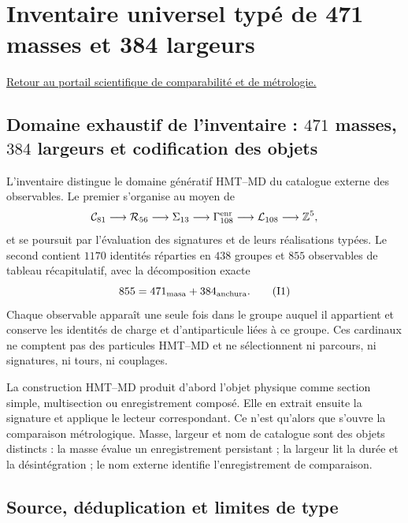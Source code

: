 \chapter{Inventaire universel typé de 471 masses et 384 largeurs}
\label{chap:inventario-universal-471-masas-384-anchuras}
\label{app:inventario-tipado-total-rev6}

\noindent\hyperref[chap:portal-atlas-inventarios-masas]{Retour au portail scientifique de comparabilité et de métrologie.}

\section{Domaine exhaustif de l’inventaire : \(471\) masses, \(384\) largeurs et codification des objets}

L’inventaire distingue le domaine génératif HMT--MD du catalogue externe des observables. Le premier s’organise au moyen de
\[
\mathcal C_{81}\longrightarrow\mathcal R_{56}\longrightarrow\Sigma_{13}
\longrightarrow\Gamma_{108}^{\rm enr}\longrightarrow
\mathcal L_{108}\longrightarrow\mathbb Z^5,
\]
et se poursuit par l’évaluation des signatures et de leurs réalisations typées. Le second contient \(1170\) identités réparties en \(438\) groupes et \(855\) observables de tableau récapitulatif, avec la décomposition exacte
\[
855=471_{\rm masa}+384_{\rm anchura}.
\tag{I1}\label{eq:censo-total-observables-pdg-rev6}
\]
Chaque observable apparaît une seule fois dans le groupe auquel il appartient et conserve les identités de charge et d’antiparticule liées à ce groupe. Ces cardinaux ne comptent pas des particules HMT--MD et ne sélectionnent ni parcours, ni signatures, ni tours, ni couplages.

\begin{exactbox}[title={Construction, évaluation et comparaison}] La construction HMT--MD produit d’abord l’objet physique comme section simple, multisection ou enregistrement composé. Elle en extrait ensuite la signature et applique le lecteur correspondant. Ce n’est qu’alors que s’ouvre la comparaison métrologique. Masse, largeur et nom de catalogue sont des objets distincts : la masse évalue un enregistrement persistant ; la largeur lit la durée et la désintégration ; le nom externe identifie l’enregistrement de comparaison.
\end{exactbox}

\section{Source, déduplication et limites de type}

